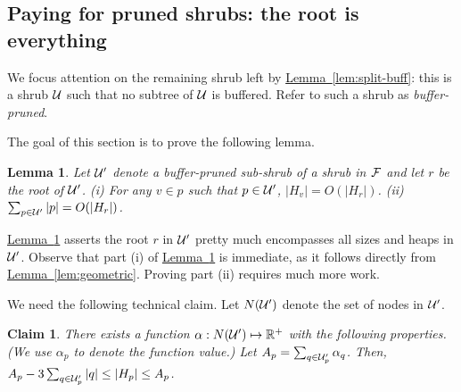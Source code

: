\documentclass[11pt]{article}
\newtheorem{claim}[theorem]{Claim}
\newtheorem{lemma}[theorem]{Lemma}
\newtheorem{definition}[theorem]{Definition}
\theoremstyle{definition}
\newcommand{\cF}{{\cal F}}
\newcommand{\cU}{{\cal U}}
\newcommand{\RR}{\mathbb{R}}
\newcommand{\Lem}[1]{\hyperref[lem:#1]{Lemma~\ref*{lem:#1}}} %
\newcommand{\Def}[1]{\hyperref[def:#1]{Definition~\ref*{def:#1}}} %
\newcommand{\pmax}{P_{\max}}
\newcommand{\redH}{\widetilde{H}}
\begin{document}
\newcommand{\pruned}{\cU'}
\subsection{Paying for pruned shrubs: the root is everything} \label{sec:weight}

We focus attention on the remaining shrub left by \Lem{split-buff}: this is 
a shrub $\cU$ such that no subtree of $\cU$ is buffered. Refer to such
a shrub as \emph{buffer-pruned}.

% 
% 
The goal of this section is to prove the following lemma.

\begin{lemma} \label{lem:cu-root} Let $\pruned$ denote a buffer-pruned sub-shrub of a shrub in $\cF$ and let $r$
be the root of $\pruned$. (i) For any $v \in p$ such that $p \in \pruned$,
$|H_v| = O(|H_r|)$. (ii) $\sum_{p \in \pruned} |p| = O(|H_r|)$.
\end{lemma}

\Lem{cu-root} asserts the root $r$ in $\pruned$ pretty much encompasses all sizes and heaps in $\pruned$.
Observe that part (i) of \Lem{cu-root} is immediate, as it follows directly from \Lem{geometric}. Proving part (ii) requires much more work.

We need the following technical claim. Let $N(\pruned)$ denote the set of nodes in $\pruned$.

\begin{claim} \label{clm:weights} There exists a function $\alpha:N(\pruned) \mapsto \RR^+$
with the following properties. (We use $\alpha_p$ to denote the function value.)
Let $A_p = \sum_{q \in \pruned_p} \alpha_q$.
Then, $A_p - 3\sum_{q \in \pruned_p} |q| \leq |H_p| \leq A_p$.
\end{claim}
\end{document}
